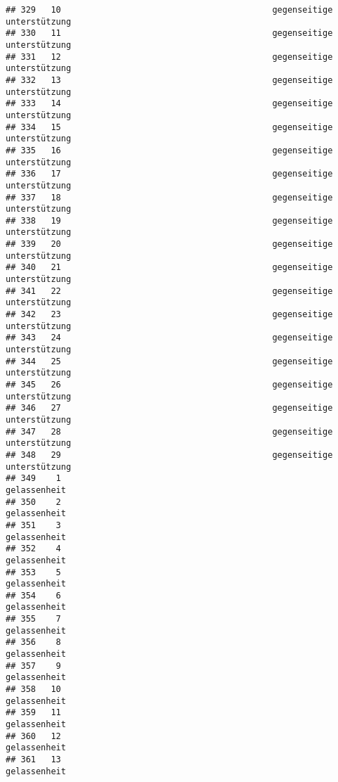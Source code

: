 \documentclass[
]{article}
\begin{document}
\begin{verbatim}
## 329   10                                          gegenseitige unterstützung
## 330   11                                          gegenseitige unterstützung
## 331   12                                          gegenseitige unterstützung
## 332   13                                          gegenseitige unterstützung
## 333   14                                          gegenseitige unterstützung
## 334   15                                          gegenseitige unterstützung
## 335   16                                          gegenseitige unterstützung
## 336   17                                          gegenseitige unterstützung
## 337   18                                          gegenseitige unterstützung
## 338   19                                          gegenseitige unterstützung
## 339   20                                          gegenseitige unterstützung
## 340   21                                          gegenseitige unterstützung
## 341   22                                          gegenseitige unterstützung
## 342   23                                          gegenseitige unterstützung
## 343   24                                          gegenseitige unterstützung
## 344   25                                          gegenseitige unterstützung
## 345   26                                          gegenseitige unterstützung
## 346   27                                          gegenseitige unterstützung
## 347   28                                          gegenseitige unterstützung
## 348   29                                          gegenseitige unterstützung
## 349    1                                                        gelassenheit
## 350    2                                                        gelassenheit
## 351    3                                                        gelassenheit
## 352    4                                                        gelassenheit
## 353    5                                                        gelassenheit
## 354    6                                                        gelassenheit
## 355    7                                                        gelassenheit
## 356    8                                                        gelassenheit
## 357    9                                                        gelassenheit
## 358   10                                                        gelassenheit
## 359   11                                                        gelassenheit
## 360   12                                                        gelassenheit
## 361   13                                                        gelassenheit

\end{verbatim}
\end{document}
